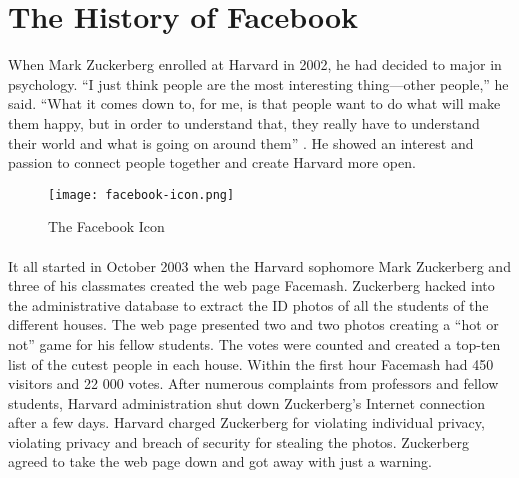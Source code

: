 \section{The History of Facebook}
When Mark Zuckerberg enrolled at Harvard in 2002, he had decided to major in psychology. “I just think people are the most interesting thing—other people,” he said. “What it comes down to, for me, is that people want to do what will make them happy, but in order to understand that, they really have to understand their world and what is going on around them” \cite{MeMedia}. He showed an interest and passion to connect people together and create Harvard more open. 

\begin{figure}[h!]
\centering
\texttt{[image: facebook-icon.png]}
\caption{The Facebook Icon}
\end{figure}

\paragraph{}
It all started in October 2003 when the Harvard sophomore Mark Zuckerberg and three of his classmates created the web page Facemash. Zuckerberg hacked into the administrative database to extract the ID photos of all the students of the different houses. The web page presented two and two photos creating a “hot or not” game for his fellow students. The votes were counted and created a top-ten list of the cutest people in each house. Within the first hour Facemash had 450 visitors and 22 000 votes. After numerous complaints from professors and fellow students, Harvard administration shut down Zuckerberg's Internet connection after a few days. Harvard charged Zuckerberg for violating individual privacy, violating privacy and breach of security for stealing the photos. Zuckerberg agreed to take the web page down and got away with just a warning.

